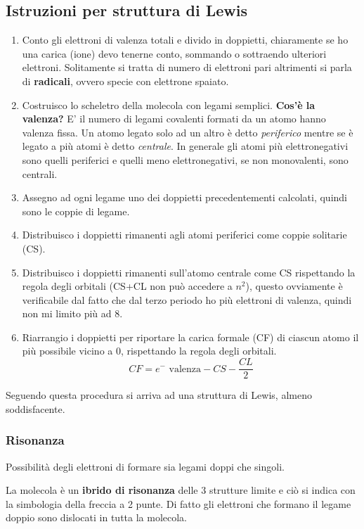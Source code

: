 \subsection{Istruzioni per struttura di Lewis}
\begin{enumerate}
    \item Conto gli elettroni di valenza totali e divido in doppietti, chiaramente se ho una carica (ione) devo tenerne conto, sommando o sottraendo ulteriori elettroni. Solitamente si tratta di numero di elettroni pari altrimenti si parla di \textbf{radicali}, ovvero specie con elettrone spaiato. 
    \item Costruisco lo scheletro della molecola con legami semplici. \textbf{Cos'è la valenza?} E' il numero di legami covalenti formati da un atomo hanno valenza fissa. Un atomo legato solo ad un altro è detto \emph{periferico} mentre se è legato a più atomi è detto \emph{centrale}. 
    In generale gli atomi più elettronegativi sono quelli periferici e quelli meno elettronegativi, se non monovalenti, sono centrali. 
    \item Assegno ad ogni legame uno dei doppietti precedentementi calcolati, quindi sono le coppie di legame. 
    \item Distribuisco i doppietti rimanenti agli atomi periferici come coppie solitarie (CS). 
    \item Distribuisco i doppietti rimanenti sull'atomo centrale come CS rispettando la regola degli orbitali (CS+CL non può accedere a $n^2$), questo ovviamente è verificabile dal fatto che dal terzo periodo ho più elettroni di valenza, quindi non mi limito più ad 8. 
    \item Riarrangio i doppietti per riportare la carica formale (CF) di ciascun atomo il più possibile vicino a 0, rispettando la regola degli orbitali. \[CF=\text{$e^{-}$ valenza} - CS - \frac{CL}{2}\]
\end{enumerate}

Seguendo questa procedura si arriva ad una struttura di Lewis, almeno soddisfacente. 

\subsubsection{Risonanza}
Possibilità degli elettroni di formare sia legami doppi che singoli. 

La molecola è un \textbf{ibrido di risonanza} delle 3 strutture limite e ciò si indica con la simbologia della freccia a 2 punte. 
Di fatto gli elettroni che formano il legame doppio sono dislocati in tutta la molecola. 

